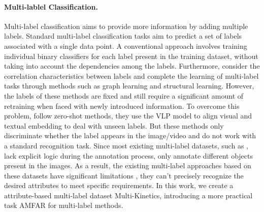 \paragraph{Multi-lablel Classification.}
Multi-label classification aims to provide more information by adding multiple labels. Standard multi-label classification tasks aim to predict a set of labels associated with a single data point. A conventional approach \cite{tsoumakas2007multi} involves training individual binary classifiers for each label present in the training dataset, without taking into account the dependencies among the labels.
Furthermore, \cite{chen2019multi,gong2013deep,zhu2017learning,sandouk2016multi} consider the correlation characteristics between labels and complete the learning of multi-label tasks through methods such as graph learning and structural learning. However, the labels of these methods are fixed and still require a significant amount of retraining when faced with newly introduced information. To overcome this problem, \cite{xu2023learning,wang2023clip} follow zero-shot methods, they use the VLP model to align visual and textual embedding to deal with unseen labels. But these methods only discriminate whether the label appears in the image/video and do not work with a standard recognition task. Since most existing multi-label datasets, such as \cite{chua2009nus}, lack explicit logic during the annotation process, only annotate different objects present in the images. As a result, the existing multi-label approaches based on these datasets have significant limitations \cite{yan2021deep,he2023open}, they can't precisely recognize the desired attributes to meet specific requirements. In this work, we create a attribute-based multi-label dataset Multi-Kinetics, introducing a more practical task AMFAR for multi-label methods.



